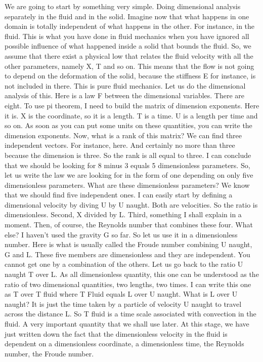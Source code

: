 We are going to start by
something very simple. Doing dimensional analysis separately
in the fluid and in the solid. Imagine now that what
happens in one domain is totally independent of
what happens in the other. For instance, in the fluid. This is what you have
done in fluid mechanics when you have ignored all possible
influence of what happened inside a solid that bounds the fluid. So, we assume that there exist
a physical low that relates the fluid velocity with all the other
parameters, namely X, T and so on. This means that the flow is not going to
depend on the deformation of the solid, because the stiffness E  for instance,
is not included in there. This is pure fluid mechanics. Let us do the dimensional
analysis of this. Here is a law F between
the dimensional variables. There are eight. To use pi theorem, I need to build
the matrix of dimension exponents. Here it is. X is the coordinate, so it is a length. T is a time. U is a  length per time and so on. As soon as you can put some
units on these quantities, you can write the dimension exponents. Now, what is a rank of this matrix? We can find three independent vectors. For instance, here. And certainly no more than three
because the dimension is three. So the rank is all equal to three. I can conclude that we
should be looking for 8 minus 3 equals 5 dimensionless parameters. So, let us write the law
we are looking for in the form of one depending on
only five dimensionless parameters. What are these dimensionless parameters? We know that we should find
five independent ones. I can easily start by defining a dimensional
velocity by diving U by U naught. Both are velocities. So the ratio is dimensionless. Second, X divided by L. Third, something I shall
explain in a moment. Then, of course, the Reynolds
number that combines these four. What else? I haven't used the gravity G so far. So let us use it in
a dimensionless number. Here is what is usually called the Froude
number combining U naught, G and L. These five members are dimensionless and
they are independent. You cannot get one by
a combination of the others. Let us go back to the ratio
U naught T over L. As all dimensionless quantity,
this one can be understood as the ratio of two dimensional quantities,
two lengths, two times. I can write this one as T over T fluid
where T Fluid equals L over U naught. What is L over U naught? It is just the time taken by
a particle of velocity U naught to travel across the distance L. So T fluid is a time scale associated
with convection in the fluid. A very important quantity
that we shall use later. At this stage, we have just written
down the fact that the dimensionless velocity in  the fluid is dependent
on a dimensionless coordinate, a dimensionless  time,
the Reynolds number, the Froude number.

